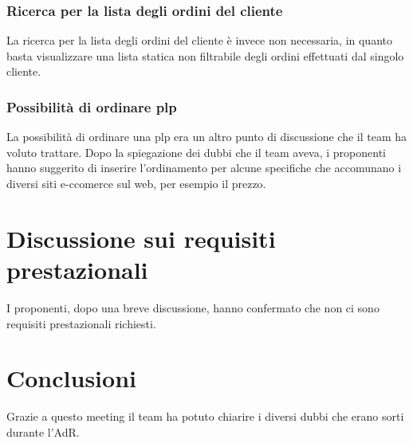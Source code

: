 \subsubsection{Ricerca per la lista degli ordini del cliente}
La ricerca per la lista degli ordini del cliente è invece non necessaria, in quanto basta visualizzare una lista statica non filtrabile degli ordini effettuati dal singolo cliente.

\subsubsection{Possibilità di ordinare plp}
La possibilità di ordinare una plp era un altro punto di discussione che il team ha voluto trattare. Dopo la spiegazione dei dubbi che il team aveva, i proponenti hanno suggerito di inserire l'ordinamento per alcune specifiche che accomunano i diversi siti e-ccomerce sul web, per esempio il prezzo.

\section{Discussione sui requisiti prestazionali}
I proponenti, dopo una breve discussione, hanno confermato che non ci sono requisiti prestazionali richiesti.

\section{Conclusioni}
Grazie a questo meeting il team ha potuto chiarire i diversi dubbi che erano sorti durante l'AdR.